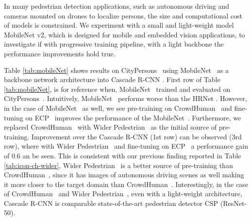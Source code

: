 \documentclass[final]{cvpr}
\newcommand{\LMR}[1]{{}}
\newcommand{\cityperson}[1]{{CityPersons~\cite{zhang2017citypersons}}}
\newcommand{\ecp}[1]{{ECP~\cite{braun2018eurocity}}}
\newcommand{\widerperson}[1]{{Wider Pedestrian~\cite{zhang2019widerperson}}}
\newcommand{\crowdhuman}[1]{{CrowdHuman~\cite{shao2018crowdhuman}}}
\newcommand{\mobnet}[1]{{MobileNet~\cite{howard2017mobilenets}}}
\begin{document}
In many pedestrian detection applications, such as autonomous driving and cameras mounted on drones to localize persons, the size and computational cost of models is constrained.
We experiment with a small and light-weight model MobileNet \cite{howard2017mobilenets} v2, which is designed for mobile and embedded vision applications, to investigate if with progressive training pipeline, with a light backbone the performance improvements hold true.

Table \ref{tab:mobileNet} shows results on \cityperson{} using \mobnet{} as a backbone network architecture into Cascade R-CNN \cite{cai2019cascade}. First row of Table \ref{tab:mobileNet}, is for reference when, \mobnet{} trained and evaluated on \cityperson{}. 
Intuitively, \mobnet{} performs worse than the HRNet \cite{wang2019deep}. 
However, in the case of \mobnet{} as well, we see pre-training on \crowdhuman{} and fine-tuning on \ecp{} improves the performance of the \mobnet{}. 
Furthermore, we replaced \crowdhuman{} with \widerperson{} as the initial source of pre-training. Improvement over the Cascade R-CNN \cite{cai2019cascade} (1st row) can be observed (3rd row), where with \widerperson{} and fine-tuning on \ecp{} a performance gain of 0.6 \LMR can be seen. 
This is consistent with our previous finding reported in Table \ref{tab:icon-ch-wider}, \widerperson{} is a better source of pre-training than \crowdhuman{}, since it has images of autonomous driving scenes as well making it more closer to the target domain than \crowdhuman{}. 
Interestingly, in the case of \crowdhuman{} and \widerperson{}, even with a light-weight architecture, Cascade R-CNN \cite{cai2019cascade} is comparable state-of-the-art pedestrian detector CSP \cite{Liu2018DBC} (ResNet-50). 


\begin{table}[tb]
\centering
\caption{Investigating  the performance of embedded vision model, when pre-trained on diverse and dense datasets.}
\label{tab:mobileNet}
\end{table}
\end{document}
